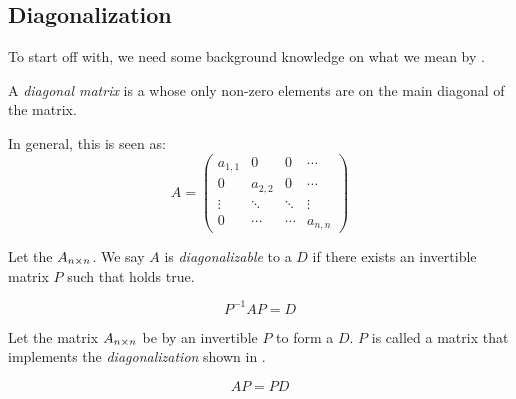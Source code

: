 \subsection{Diagonalization}\label{subsec:Diagonalization}
To start off with, we need some background knowledge on what we mean by .

\begin{definition}\label{def:Diagonal_Matrix}
  A \emph{diagonal matrix} is a  whose only non-zero elements are on the main diagonal of the matrix.

  In general, this is seen as:
  \begin{equation}\label{eq:Diagonal_Matrix}
    A =
    \begin{pmatrix}
      a_{1,1} & 0 & 0 & \cdots \\
      0 & a_{2,2} & 0 & \cdots \\
      \vdots & \ddots & \ddots & \vdots \\
      0 & \cdots & \cdots & a_{n, n}
    \end{pmatrix}
  \end{equation}
\end{definition}

\begin{definition}[Diagonalizable]\label{def:Diagonalizable}
  Let the  $A_{n \times n}$.
  We say $A$ is \emph{diagonalizable} to a  $D$ if there exists an invertible matrix $P$ such that  holds true.

  \begin{equation}\label{eq:Diagonalizable}
    P^{-1} A P = D
  \end{equation}
\end{definition}

\begin{definition}[Diagonalization]\label{def:Diagonalization}
  Let the matrix $A_{n \times n}$ be  by an invertible  $P$ to form a  $D$.
  $P$ is called a matrix that implements the \emph{diagonalization} shown in .

  \begin{equation}\label{eq:Diagonalization}
    AP = PD
  \end{equation}
\end{definition}


